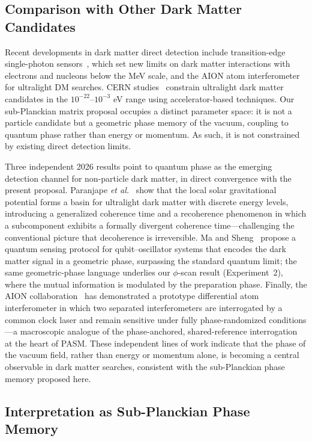 ﻿\documentclass[12pt,a4paper]{article}
\begin{document}
\subsection{Comparison with Other Dark Matter Candidates}

Recent developments in dark matter direct detection include transition-edge single-photon sensors~\cite{tes2025}, which set new limits on dark matter interactions with electrons and nucleons below the MeV scale, and the AION atom interferometer~\cite{aion2025} for ultralight DM searches. CERN studies~\cite{cern2025} constrain ultralight dark matter candidates in the $10^{-22}$--$10^{-3}$ eV range using accelerator-based techniques. Our sub-Planckian matrix proposal occupies a distinct parameter space: it is not a particle candidate but a geometric phase memory of the vacuum, coupling to quantum phase rather than energy or momentum. As such, it is not constrained by existing direct detection limits.

Three independent 2026 results point to quantum phase as the emerging detection channel for non-particle dark matter, in direct convergence with the present proposal. Paranjape \textit{et al.}~\cite{recoherence2026} show that the local solar gravitational potential forms a basin for ultralight dark matter with discrete energy levels, introducing a generalized coherence time and a recoherence phenomenon in which a subcomponent exhibits a formally divergent coherence time---challenging the conventional picture that decoherence is irreversible. Ma and Sheng~\cite{ma2026geometric} propose a quantum sensing protocol for qubit--oscillator systems that encodes the dark matter signal in a geometric phase, surpassing the standard quantum limit; the same geometric-phase language underlies our $\phi$-scan result (Experiment~2), where the mutual information is modulated by the preparation phase. Finally, the AION collaboration~\cite{aion2026nature} has demonstrated a prototype differential atom interferometer in which two separated interferometers are interrogated by a common clock laser and remain sensitive under fully phase-randomized conditions---a macroscopic analogue of the phase-anchored, shared-reference interrogation at the heart of PASM. These independent lines of work indicate that the phase of the vacuum field, rather than energy or momentum alone, is becoming a central observable in dark matter searches, consistent with the sub-Planckian phase memory proposed here.

\subsection{Interpretation as Sub-Planckian Phase Memory}
\end{document}
